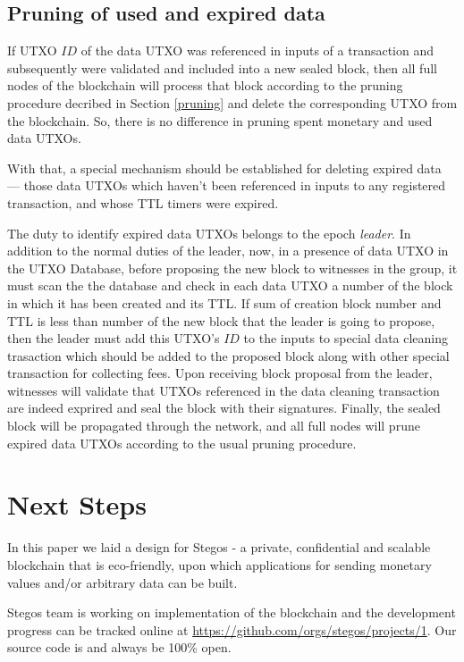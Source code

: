 \documentclass[a4paper, 10pt, conference]{ieeeconf}
\begin{document}
\subsection{Pruning of used and expired data}

If UTXO $ID$ of the data UTXO was referenced in inputs of a transaction and subsequently were validated and included into a new sealed block, then all full nodes of the blockchain will process that block according to the pruning procedure decribed in Section \ref{pruning} and delete the corresponding UTXO from the blockchain. So, there is no difference in pruning spent monetary and used data UTXOs.

With that, a special mechanism should be established for deleting expired data --- those data UTXOs which haven't been referenced in inputs to any registered transaction, and whose TTL timers were expired.

The duty to identify expired data UTXOs belongs to the epoch \textit{leader}. In addition to the normal duties of the leader, now, in a presence of data UTXO in the UTXO Database, before proposing the new block to witnesses in the group, it must scan the the database and check in each data UTXO a number of the block in which it has been created and its TTL. If sum of creation block number and TTL is less than number of the new block that the leader is going to propose, then the leader must add this UTXO's $ID$ to the inputs to special data cleaning trasaction which should be added to the proposed block along with other special transaction for collecting fees. 
\addtolength{\textheight}{-38mm}
Upon receiving block proposal from the leader, witnesses will validate that UTXOs referenced in the data cleaning transaction are indeed exprired and seal the block with their signatures. Finally, the sealed block will be propagated through the network, and all full nodes will prune expired data UTXOs according to the usual pruning procedure.

\section{Next Steps}

In this paper we laid a design for Stegos - a private, confidential and scalable blockchain that is eco-friendly, upon which applications for sending monetary values and/or arbitrary data can be built.

Stegos team is working on implementation of the blockchain and the development progress can be tracked online at \url{https://github.com/orgs/stegos/projects/1}. Our source code is and always be 100\% open.
\end{document}
